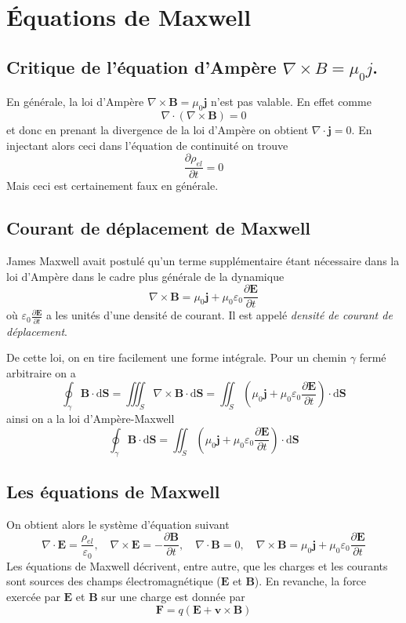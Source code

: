 \documentclass[10pt]{article}
\numberwithin{equation}{section}
\begin{document}
\clearpage
\section{Équations de Maxwell}
\subsection{Critique de l'équation d'Ampère $\nabla \times B = \mu_0 j$.}
En générale, la loi d'Ampère $\nabla \times \bm B = \mu_0 \bm j$ n'est pas valable. En effet comme
\[
\nabla \cdot (\nabla \times \bm B) = 0
\]
et donc en prenant la divergence de la loi d'Ampère on obtient $\nabla \cdot \bm j = 0$. En injectant alors ceci dans l'équation de continuité on trouve
\[
\frac{\partial \rho_{el}}{\partial t} = 0 
\]
Mais ceci est certainement faux en générale.

\subsection{Courant de déplacement de Maxwell}
James Maxwell avait postulé qu'un terme supplémentaire étant nécessaire dans la loi d'Ampère dans le cadre plus générale de la dynamique
\[
\boxed{\nabla \times \bm B = \mu_0 \bm j + \mu_0 \varepsilon_0 \frac{\partial \bm E}{\partial t}}
\]
où $\varepsilon_0 \frac{\partial \bm E}{\partial t}$ a les unités d'une densité de courant. Il est appelé \emph{densité de courant de déplacement}.

De cette loi, on en tire facilement une forme intégrale. Pour un chemin $\gamma$ fermé arbitraire on a
\[
\oint_\gamma \bm B \cdot \mathrm d \bm S = \iiint_S \nabla \times \bm B \cdot \mathrm d \bm S = \iint_S \left(\mu_0 \bm j + \mu_0 \varepsilon_0 \frac{\partial \bm E}{\partial t} \right) \cdot \mathrm d \bm S
\]
ainsi on a la loi d'Ampère-Maxwell
\[
\oint_\gamma \bm B \cdot \mathrm d \bm S = \iint_S \left(\mu_0 \bm j + \mu_0 \varepsilon_0 \frac{\partial \bm E}{\partial t} \right) \cdot \mathrm d \bm S
\]
\subsection{Les équations de Maxwell}
On obtient alors le système d'équation suivant
\[
\nabla \cdot \bm E = \frac{\rho_{el}}{\varepsilon_0}, \quad \nabla \times \bm E = - \frac{\partial \bm B}{\partial t}, \quad \nabla \cdot \bm B = 0, \quad \nabla \times \bm B = \mu_0 \bm j + \mu_0 \varepsilon_0 \frac{\partial \bm E}{\partial t}
\]
Les équations de Maxwell décrivent, entre autre, que les charges et les courants sont sources des champs électromagnétique ($\bm E$ et $\bm B$). En revanche, la force exercée par $\bm E$ et $\bm B$ sur une charge est donnée par
\[
\bm F = q(\bm E + \bm v \times \bm B)
\]
\end{document}
